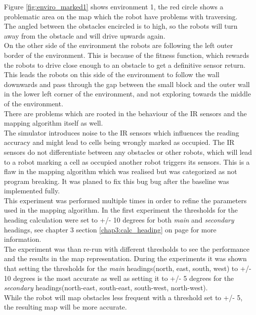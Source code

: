 Figure \ref{fig:enviro_marked1} shows environment 1, the red circle shows a  problematic area on the map which the robot have problems with traversing.\\
The angled between the obstacles encircled is to high, so the robots will turn away from the obstacle and will drive upwards again. \\
On the other side of the environment the robots are following the left outer border of the environment. This is because of the fitness function, which rewards the robots to drive close enough to an obstacle to get a definitive sensor return. 
This leads the robots on this side of the environment to follow the wall downwards and pass through the gap between the small block and the outer wall in the lower left corner of the environment, and not exploring towards the middle of the environment.\\

There are problems which are rooted in the behaviour of the IR sensors and the mapping algorithm itself as well.\\
The simulator introduces noise to the IR sensors which influences the reading accuracy and might lead to cells being wrongly marked as occupied. 
The IR sensors do not differentiate between any obstacles or other robots, 
which will lead to a robot marking a cell as occupied another robot triggers its sensors. This is a flaw in the mapping algorithm which was realised but was categorized as not program breaking. It was planed to fix this bug bug after the baseline was implemented fully. \\ 

This experiment was performed multiple times in order to refine the parameters used in the mapping algorithm. In the first experiment the thresholds for the heading calculation were set to +/- 10 degrees for both \textit{main} and \textit{secondary} headings, see chapter 3 section \ref{chap3:calc_heading} on page \pageref{chap3:calc_heading} for more information. \\
The experiment was than re-run with different thresholds to see the performance and the results in the map representation. 
During the experiments it was shown that setting the thresholds for the \textit{main} headings(north, east, south, west) to +/- 10 degrees is the most accurate as well as setting it to +/- 5 degrees for the \textit{secondary} headings(north-east, south-east, south-west, north-west).\\
While the robot will map obstacles less frequent with a threshold set to +/- 5, the resulting map will be more accurate. \\

